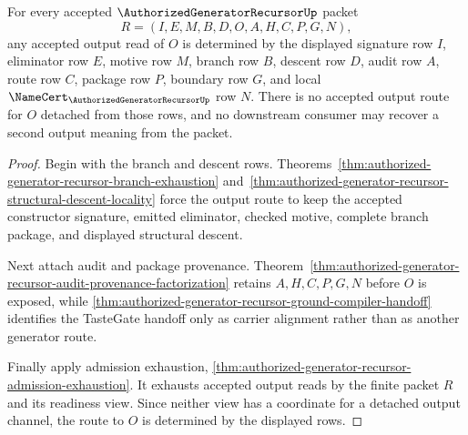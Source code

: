 \begin{theorem}
\label{thm:authorized-generator-recursor-output-route-determinacy}
For every accepted $\AuthorizedGeneratorRecursorUp$ packet
$$
R=(I,E,M,B,D,O,A,H,C,P,G,N),
$$
any accepted output read of $O$ is determined by the displayed signature row $I$, eliminator row $E$, motive row $M$, branch row $B$, descent row $D$, audit row $A$, route row $C$, package row $P$, boundary row $G$, and local $\NameCert_{\AuthorizedGeneratorRecursorUp}$ row $N$. There is no accepted output route for $O$ detached from those rows, and no downstream consumer may recover a second output meaning from the packet.
\end{theorem}
\begin{proof}
Begin with the branch and descent rows. Theorems~\ref{thm:authorized-generator-recursor-branch-exhaustion} and~\ref{thm:authorized-generator-recursor-structural-descent-locality} force the output route to keep the accepted constructor signature, emitted eliminator, checked motive, complete branch package, and displayed structural descent.

Next attach audit and package provenance. Theorem~\ref{thm:authorized-generator-recursor-audit-provenance-factorization} retains $A,H,C,P,G,N$ before $O$ is exposed, while \autoref{thm:authorized-generator-recursor-ground-compiler-handoff} identifies the TasteGate handoff only as carrier alignment rather than as another generator route.

Finally apply admission exhaustion, \autoref{thm:authorized-generator-recursor-admission-exhaustion}. It exhausts accepted output reads by the finite packet $R$ and its readiness view. Since neither view has a coordinate for a detached output channel, the route to $O$ is determined by the displayed rows.
\end{proof}

